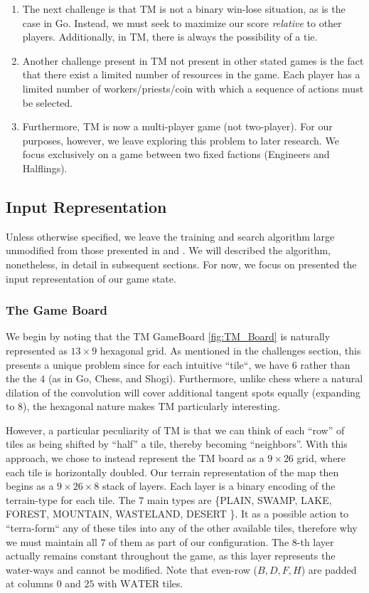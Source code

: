 \documentclass[10pt,twocolumn,letterpaper]{article}
\begin{document}
\begin{enumerate}
\begin{enumerate}
    \end{enumerate}
    \item The next challenge is that TM is not a binary win-lose situation, as is the case in Go. Instead, we must seek to maximize our score \textit{relative} to other players. Additionally, in TM, there is always the possibility of a tie. 
    \item Another challenge present in TM not present in other stated games is the fact that there exist a limited number of resources in the game. Each player has a limited number of workers/priests/coin with which a sequence of actions must be selected.
    \item Furthermore, TM is now a multi-player game (not two-player). For our purposes, however, we leave exploring this problem to later research. We focus exclusively on a game between two fixed factions (Engineers and Halflings).
\end{enumerate}

\subsection{Input Representation}
\label{subsection:input_representation}
Unless otherwise specified, we leave the training and search algorithm large unmodified from those presented in \cite{AlphaZero} and \cite{AlphaGoZero}. We will described the algorithm, nonetheless, in detail in subsequent sections. For now, we focus on presented the input representation of our game state.

\subsubsection{The Game Board}
\label{subsubsection:the_game_board}

We begin by noting that the TM GameBoard \ref{fig:TM_Board} is naturally represented as $13 \times 9$ hexagonal grid. As mentioned in the challenges section, this presents a unique problem since for each intuitive ``tile``, we have $6$ rather than the the $4$ (as in Go, Chess, and Shogi). Furthermore, unlike chess where a natural dilation of the convolution will cover additional tangent spots equally (expanding to $8$), the hexagonal nature makes TM particularly interesting.

However, a particular peculiarity of TM is that we can think of each ``row'' of tiles as being shifted by ``half'' a tile, thereby becoming ``neighbors''. With this approach, we chose to instead represent the TM board as a $9 \times 26$ grid, where each tile is horizontally doubled. Our terrain representation of the map then begins as a $9 \times 26 \times 8$ stack of layers. Each layer is a binary encoding of the terrain-type for each tile. The $7$ main types are \{PLAIN, SWAMP, LAKE, FOREST, MOUNTAIN, WASTELAND, DESERT \}. It as a possible action to ``terra-form`` any of these tiles into any of the other available tiles, therefore why we must maintain all $7$ of them as part of our configuration. The $8$-th layer actually remains constant throughout the game, as this layer represents the water-ways and cannot be modified. Note that even-row ($B, D, F, H$) are padded at columns $0$ and $25$ with $\text{WATER}$ tiles.
\end{document}
